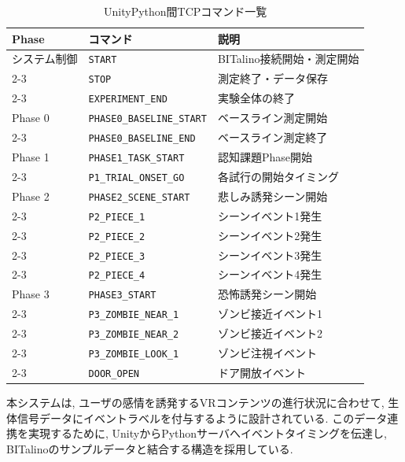\documentclass[book,paper=a4,fontsize=10pt,jafontscale=0.92]{jlreq}
\begin{document}
\begin{table}[t]
\centering
\caption{Unity\textendash Python間TCPコマンド一覧}
\label{tab:tcp_commands}
\begin{tabular}{|l|l|l|}
\hline
\textbf{Phase} & \textbf{コマンド} & \textbf{説明} \\
\hline
\hline
システム制御 & \texttt{START} & BITalino接続開始・測定開始 \\
\cline{2-3}
 & \texttt{STOP} & 測定終了・データ保存 \\
\cline{2-3}
 & \texttt{EXPERIMENT\_END} & 実験全体の終了 \\
\hline
\hline
Phase 0 & \texttt{PHASE0\_BASELINE\_START} & ベースライン測定開始 \\
\cline{2-3}
 & \texttt{PHASE0\_BASELINE\_END} & ベースライン測定終了 \\
\hline
\hline
Phase 1 & \texttt{PHASE1\_TASK\_START} & 認知課題Phase開始 \\
\cline{2-3}
 & \texttt{P1\_TRIAL\_ONSET\_GO} & 各試行の開始タイミング \\
\hline
\hline
Phase 2 & \texttt{PHASE2\_SCENE\_START} & 悲しみ誘発シーン開始 \\
\cline{2-3}
 & \texttt{P2\_PIECE\_1} & シーンイベント1発生 \\
\cline{2-3}
 & \texttt{P2\_PIECE\_2} & シーンイベント2発生 \\
\cline{2-3}
 & \texttt{P2\_PIECE\_3} & シーンイベント3発生 \\
\cline{2-3}
 & \texttt{P2\_PIECE\_4} & シーンイベント4発生 \\
\hline
\hline
Phase 3 & \texttt{PHASE3\_START} & 恐怖誘発シーン開始 \\
\cline{2-3}
 & \texttt{P3\_ZOMBIE\_NEAR\_1} & ゾンビ接近イベント1 \\
\cline{2-3}
 & \texttt{P3\_ZOMBIE\_NEAR\_2} & ゾンビ接近イベント2 \\
\cline{2-3}
 & \texttt{P3\_ZOMBIE\_LOOK\_1} & ゾンビ注視イベント \\
\cline{2-3}
 & \texttt{DOOR\_OPEN} & ドア開放イベント \\
\hline
\end{tabular}
\end{table}

本システムは, ユーザの感情を誘発するVRコンテンツの進行状況に合わせて, 生体信号データにイベントラベルを付与するように設計されている. このデータ連携を実現するために, UnityからPythonサーバへイベントタイミングを伝達し, BITalinoのサンプルデータと結合する構造を採用している.
\end{document}
